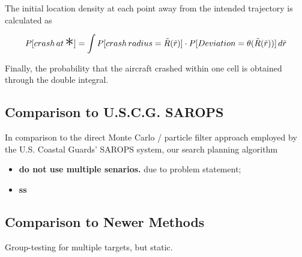 \documentclass[12pt, letterpaper]{article}  %
\theoremstyle{definition}
\theoremstyle{remark}
\newtheorem{lem}[thm]{Lemma}
\theoremstyle{plain}
\begin{document}
The initial location density at each point away from the intended trajectory is calculated as

\[P[crash\,at\,\text{\huge $\ast$}] = \int P[crash\,radius=\tilde{R}(\tilde{r})]\cdot P[Deviation=\theta(\tilde{R}(\tilde{r}))]\,d\tilde{r}\]

Finally, the probability that the aircraft crashed within one cell is obtained through the double integral.







\subsection{Comparison to U.S.C.G. SAROPS}\label{subsec:sarops}





In comparison to the direct Monte Carlo / particle filter approach employed by the U.S. Coastal Guards' SAROPS system, our search planning algorithm
\begin{itemize}
	\item \textbf{do not use multiple senarios.} due to problem statement;
	\item \textbf{ss}
\end{itemize}


\subsection{Comparison to Newer Methods}\label{subsec:newer}
Group-testing for multiple targets, but static.
\end{document}
